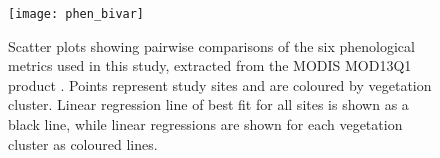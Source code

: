 \documentclass[11pt,a4paper]{article}
\begin{document}


\begin{figure}[H]
\centering
	\texttt{[image: phen\_bivar]}
	\caption{Scatter plots showing pairwise comparisons of the six phenological metrics used in this study, extracted from the MODIS MOD13Q1 product \citep{MOD13Q1}. Points represent study sites and are coloured by vegetation cluster. Linear regression line of best fit for all sites is shown as a black line, while linear regressions are shown for each vegetation cluster as coloured lines.}
	\label{phen_bivar}
\end{figure}



\renewcommand{\arraystretch}{0.8}



\end{document}
